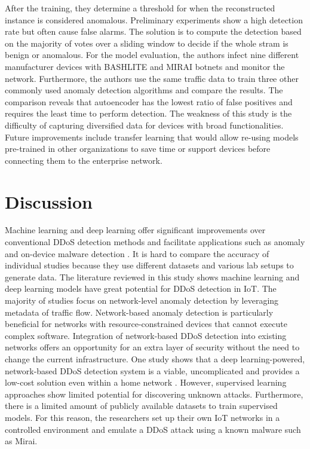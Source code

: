 \documentclass[conference, 11pt]{IEEEtran}
\begin{document}
    After the training, they determine a threshold for when the reconstructed instance is considered anomalous.
    Preliminary experiments show a high detection rate but often cause false alarms.
    The solution is to compute the detection based on the majority of votes over a sliding window to decide if the whole stram is benign or anomalous.
    For the model evaluation, the authors infect nine different manufacturer devices with BASHLITE and MIRAI botnets and monitor the network.
    Furthermore, the authors use the same traffic data to train three other commonly used anomaly detection algorithms and compare the results.
    The comparison reveals that autoencoder has the lowest ratio of false positives and requires the least time to perform detection.
    The weakness of this study is the difficulty of capturing diversified data for devices with broad functionalities.
    Future improvements include transfer learning that would allow re-using models pre-trained in other organizations to save time or support devices before connecting them to the enterprise network.


    \section{Discussion}
    Machine learning and deep learning offer significant improvements over conventional DDoS detection methods and facilitate applications such as anomaly and on-device malware detection \cite{article:15}.
    It is hard to compare the accuracy of individual studies because they use different datasets and various lab setups to generate data.
    The literature reviewed in this study shows machine learning and deep learning models have great potential for DDoS detection in IoT.
    The majority of studies focus on network-level anomaly detection by leveraging metadata of traffic flow.
    Network-based anomaly detection is particularly beneficial for networks with resource-constrained devices that cannot execute complex software.
    Integration of network-based DDoS detection into existing networks offers an opportunity for an extra layer of security without the need to change the current infrastructure.
    One study shows that a deep learning-powered, network-based DDoS detection system is a viable, uncomplicated and provides a low-cost solution even within a home network \cite{inproceedings:1}.
    However, supervised learning approaches show limited potential for discovering unknown attacks.
    Furthermore, there is a limited amount of publicly available datasets to train supervised models.
    For this reason, the researchers set up their own IoT networks in a controlled environment and emulate a DDoS attack using a known malware such as Mirai.
\end{document}
